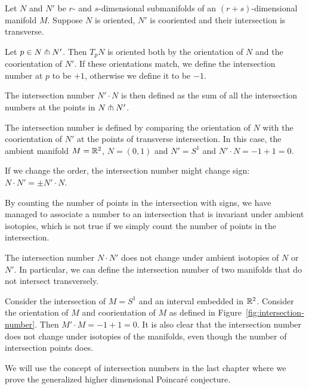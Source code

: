 \begin{definition}
    Let $N$ and  $N'$ be $r$- and  $s$-dimensional submanifolds of an $(r+s)$-dimensional manifold $M$.
    Suppose $N$ is oriented, $N'$ is cooriented and their intersection is transverse.

    Let $p \in  N \pitchfork N'$.
    Then $T_p N$ is oriented both by the orientation of  $N$ and the coorientation of  $N'$.
    If these orientations match, we define the intersection number at $p$ to be $+1$, otherwise we define it to be $-1$.

    The intersection number  $N' \cdot N$ is then defined as the sum of all the intersection numbers at the points in $N \pitchfork N'$.
\end{definition}
\begin{marginfigure}[-4cm]
    \centering
    \caption{
        The intersection number is defined by comparing the orientation of $N$ with the coorientation of $N'$ at the points of transverse intersection.
        In this case, the ambient manifold $M = \mathbb{R}^2$, $N = (0,1)$ and $N' = S^1$ and $N' \cdot N = -1 + 1 = 0$.
    }
    \label{fig:intersection-number}
\end{marginfigure}
\begin{remark}
    If we change the order, the intersection number might change sign: $N \cdot N' =  \pm N' \cdot N$.
\end{remark}
By counting the number of points in the intersection with signs,
we have managed to associate a number to an intersection that is invariant under ambient isotopies, which is not true if we simply count the number of points in the intersection.
\begin{prop}
    The intersection number $N \cdot N'$ does not change under ambient isotopies of $N$ or $N'$.
    In particular, we can define the intersection number of two manifolds that do not intersect transversely.
\end{prop}
\begin{eg}
    Consider the intersection of $M  = S^{1}$ and an interval embedded in $\mathbb{R}^2$. Consider the orientation of $M$ and coorientation of $M$ as defined in Figure~\ref{fig:intersection-number}. Then $M' \cdot M  = -1 + 1 = 0$.
    It is also clear that the intersection number does not change under isotopies of the manifolds, even though the number of intersection points does.
\end{eg}

We will use the concept of intersection numbers in the last chapter where we prove the generalized higher dimensional Poincaré conjecture.

